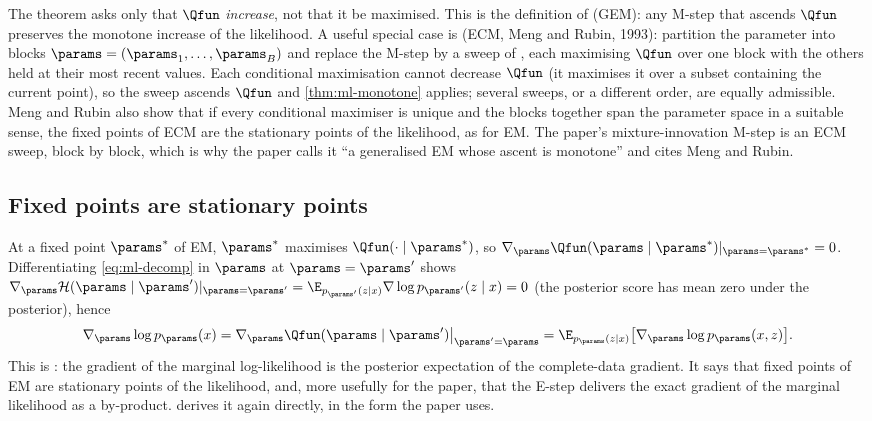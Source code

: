 The theorem asks only that $\Qfun$ \emph{increase}, not that it be maximised. This is the
definition of  (GEM): any M-step that ascends $\Qfun$ preserves
the monotone increase of the likelihood. A useful special case is
 (ECM, Meng and Rubin, 1993): partition the
parameter into blocks $\params=(\params_1,\dots,\params_B)$ and replace the M-step by a
sweep of , each maximising $\Qfun$ over one block with
the others held at their most recent values. Each conditional maximisation cannot
decrease $\Qfun$ (it maximises it over a subset containing the current point), so the
sweep ascends $\Qfun$ and \cref{thm:ml-monotone} applies; several sweeps, or a
different order, are equally admissible. Meng and Rubin also show that if every
conditional maximiser is unique and the blocks together span the parameter space in a
suitable sense, the fixed points of ECM are the stationary points of the likelihood,
as for EM. The paper's mixture-innovation M-step is an ECM sweep, block by block,
which is why the paper calls it ``a generalised EM whose ascent is monotone'' and
cites Meng and Rubin.

\subsection{Fixed points are stationary points}

At a fixed point $\params^\ast$ of EM, $\params^\ast$ maximises $\Qfun(\cdot\mid\params^\ast)$,
so $\nabla_\params\Qfun(\params\mid\params^\ast)|_{\params=\params^\ast}=0$. Differentiating
\cref{eq:ml-decomp} in $\params$ at $\params=\params'$ shows
$\nabla_\params\mathcal H(\params\mid\params')|_{\params=\params'}=\E_{p_{\params'}(z\mid x)}\nabla\log p_{\params'}(z\mid x)=0$
(the posterior score has mean zero under the posterior), hence
\begin{equation}
  \nabla_\params\log p_\params(x)=\nabla_\params\Qfun(\params\mid\params')\big|_{\params'=\params}
  =\E_{p_\params(z\mid x)}\bigl[\nabla_\params\log p_\params(x,z)\bigr].
  \label{eq:ml-fisher}
\end{equation}
This is : the gradient of the marginal log-likelihood is the
posterior expectation of the complete-data gradient. It says that fixed points of EM
are stationary points of the likelihood, and, more usefully for the paper, that the
E-step delivers the exact gradient of the marginal likelihood as a by-product.
 derives it again directly, in the form the paper uses.

